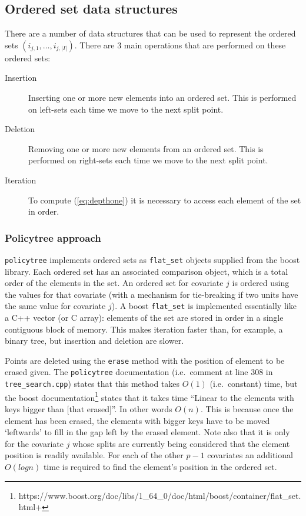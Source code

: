 \documentclass{article}
\newcommand{\policytree}{\texttt{policytree}}
\begin{document}
\subsection{Ordered set data structures}
\label{sec:orderedsets}

There are a number of data structures that can be used to represent
the ordered sets $(i_{j,1}, \dots, i_{j,|I|})$. There are 3 main
operations that are performed on these ordered sets:
\begin{description}
\item[Insertion] Inserting one or more new elements into an ordered
  set. This is performed on left-sets each time we move to the next
  split point.
\item[Deletion] Removing one or more new elements from an ordered
  set. This is performed on right-sets each time we move to the next
  split point.
\item[Iteration] To compute (\ref{eq:depthone}) it is necessary to
  access each element of the set in order.
\end{description}

\subsubsection{Policytree approach}
\label{sec:policytreeos}

\policytree{} implements ordered sets as \texttt{flat\_set} objects
supplied from the boost library. Each ordered set has an associated
comparison object, which is a total order of the elements in the
set. An ordered set for covariate $j$ is ordered using the values for
that covariate (with a mechanism for tie-breaking if two units have
the same value for covariate $j$). A boost \texttt{flat\_set} is
implemented essentially like a C++ vector (or C array): elements of
the set are stored in order in a single contiguous block of
memory. This makes iteration faster than, for example, a binary tree,
but insertion and deletion are slower.

Points are deleted using the \texttt{erase} method with the position
of element to be erased given. The \policytree{} documentation (i.e.\
comment at line 308 in \verb+tree_search.cpp+) states that this method
takes $O(1)$ (i.e.\ constant) time, but the boost
documentation\footnote{https://www.boost.org/doc/libs/1\_64\_0/doc/html/boost/container/flat\_set.html+}
states that it takes time ``Linear to the elements with keys bigger
than [that erased]''. In other words $O(n)$. This is because once the
element has been erased, the elements with bigger keys have to be
moved `leftwards' to fill in the gap left by the erased element. Note
also that it is only for the covariate $j$ whose splits are currently
being considered that the element position is readily available. For
each of the other $p-1$ covariates an additional $O(log n)$ time is
required to find the element's position in the ordered set.
\end{document}
